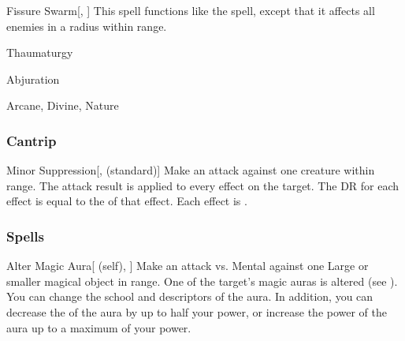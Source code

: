 \lowercase{\hypertarget{spell:Fissure Swarm}{}}\label{spell:Fissure Swarm}
\begin{apability}[\nth{6}]{\hypertarget{spell:Fissure Swarm}{Fissure Swarm}}[, ]
This spell functions like the  spell, except that it affects all enemies in a \areamed radius within \rngmed range.
\end{apability}
\vspace{0.25em}


\newpage
\begin{spellsection}{Thaumaturgy}

\begin{spellheader}
\end{spellheader}


 Abjuration

 Arcane, Divine, Nature

\subsubsection{Cantrip}


\begin{freeability}{Minor Suppression}[,  (standard)]
Make an attack against one creature within \rngmed range.
The attack result is applied to every  effect on the target.
The DR for each effect is equal to the  of that effect.
\hit Each effect is .
\end{freeability}

\end{spellsection}


\subsubsection{Spells}


\lowercase{\hypertarget{spell:Alter Magic Aura}{}}\label{spell:Alter Magic Aura}
\begin{attuneability}[\nth{1}]{\hypertarget{spell:Alter Magic Aura}{Alter Magic Aura}}[ (self), ]
Make an attack vs. Mental against one Large or smaller magical object in \rngmed range.
\hit One of the target's magic auras is altered (see ).
You can change the school and descriptors of the aura.
In addition, you can decrease the  of the aura by up to half your power, or increase the power of the aura up to a maximum of your power.
\end{attuneability}
\vspace{0.25em}



